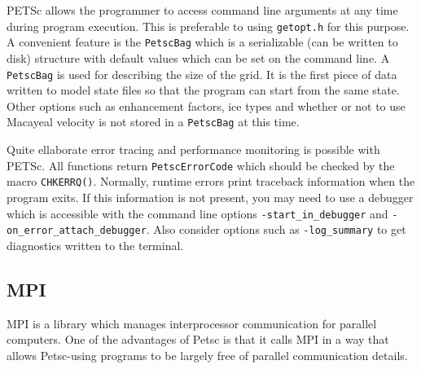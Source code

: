 \documentclass[11pt,final]{amsart}
\renewcommand{\t}[1]{\texttt{#1}}
\begin{document}
PETSc allows the programmer to access command line arguments at any time during program
execution. This is preferable to using \t{getopt.h} for this purpose. A convenient feature
is the \t{PetscBag} which is a serializable (can be written to disk) structure with
default values which can be set on the command line. A \t{PetscBag} is used for describing
the size of the grid. It is the first piece of data written to model state files so that
the program can start from the same state. Other options such as enhancement factors, ice
types and whether or not to use Macayeal velocity is not stored in a \t{PetscBag} at this
time.

Quite ellaborate error tracing and performance monitoring is possible with PETSc. All
functions return \t{PetscErrorCode} which should be checked by the macro \t{CHKERRQ()}.
Normally, runtime errors print traceback information when the program exits. If this
information is not present, you may need to use a debugger which is accessible with the
command line options \verb|-start_in_debugger| and \verb|-on_error_attach_debugger|. Also
consider options such as \verb|-log_summary| to get diagnostics written to the terminal.

\subsection{MPI}  MPI is a library which manages interprocessor communication for parallel computers.  One of the advantages of Petsc is that it calls MPI in a way that allows Petsc-using programs to be largely free of parallel communication details.




\end{document}
